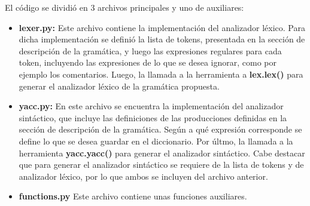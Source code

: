 El c\'odigo se dividi\'o en 3 archivos principales y uno de auxiliares:
\begin{itemize}
\item [] \textbf{lexer.py:} Este archivo contiene la implementaci\'on del analizador l\'exico. Para dicha implementaci\'on se defini\'o la lista de tokens, presentada en la secci\'on de descripci\'on de la gram\'atica, y luego las expresiones regulares para cada token, incluyendo las expresiones de lo que se desea ignorar, como por ejemplo los comentarios. Luego, la llamada a la herramienta a \textbf{lex.lex()} para generar el analizador l\'exico de la gram\'atica propuesta.

\item [] \textbf{yacc.py:} En este archivo se encuentra la implementaci\'on del analizador sint\'actico, que incluye las definiciones de las producciones definidas en la secci\'on de descripci\'on de la gram\'atica. Seg\'un a qu\'e expresi\'on corresponde se define lo que se desea guardar en el diccionario. Por \'ultmo, la llamada a la herramienta \textbf{yacc.yacc()} para generar el analizador sint\'actico. Cabe destacar que para generar el analizador sint\'actico se requiere de la lista de tokens y de analizador l\'exico, por lo que ambos se incluyen del archivo anterior.

\item [] \textbf{functions.py} Este archivo contiene unas funciones auxiliares.
\end{itemize}
